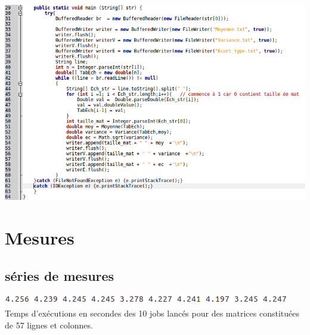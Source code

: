 \documentclass[a4paper, 11pt]{article}
\begin{document}
    \vspace{2\baselineskip}
    \label{stat2}
  	\begin{center}
        \includegraphics[scale=0.8, angle=90]{./img/Stat2.png}
    \end{center}
    \vspace{2\baselineskip}
    \clearpage
    
\section{Mesures}
	\subsection{séries de mesures}
	\label{txtmesures10jobs}
	\begin{center}
		\includegraphics[scale=0.9, angle=0]{./img/fichier57.png}
		Temps d'exécutions en secondes des 10 jobs lancés pour des matrices constituées de 57 lignes et colonnes.
	\end{center}
	
\end{document}
